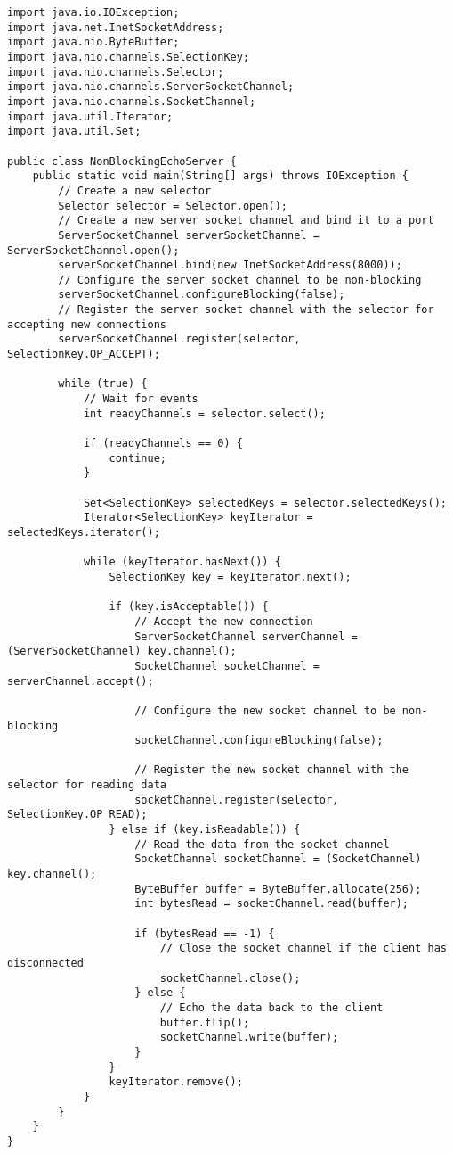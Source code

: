 \documentclass[../vs-script-first-v01.tex]{subfiles}
\begin{document}
\begin{lstlisting}[caption={Non-Blocking},captionpos=b,label={lst:nonb}]
import java.io.IOException;
import java.net.InetSocketAddress;
import java.nio.ByteBuffer;
import java.nio.channels.SelectionKey;
import java.nio.channels.Selector;
import java.nio.channels.ServerSocketChannel;
import java.nio.channels.SocketChannel;
import java.util.Iterator;
import java.util.Set;

public class NonBlockingEchoServer {
    public static void main(String[] args) throws IOException {
        // Create a new selector
        Selector selector = Selector.open();
        // Create a new server socket channel and bind it to a port
        ServerSocketChannel serverSocketChannel = ServerSocketChannel.open();
        serverSocketChannel.bind(new InetSocketAddress(8000));
        // Configure the server socket channel to be non-blocking
        serverSocketChannel.configureBlocking(false);
        // Register the server socket channel with the selector for accepting new connections
        serverSocketChannel.register(selector, SelectionKey.OP_ACCEPT);

        while (true) {
            // Wait for events
            int readyChannels = selector.select();

            if (readyChannels == 0) {
                continue;
            }

            Set<SelectionKey> selectedKeys = selector.selectedKeys();
            Iterator<SelectionKey> keyIterator = selectedKeys.iterator();

            while (keyIterator.hasNext()) {
                SelectionKey key = keyIterator.next();

                if (key.isAcceptable()) {
                    // Accept the new connection
                    ServerSocketChannel serverChannel = (ServerSocketChannel) key.channel();
                    SocketChannel socketChannel = serverChannel.accept();

                    // Configure the new socket channel to be non-blocking
                    socketChannel.configureBlocking(false);

                    // Register the new socket channel with the selector for reading data
                    socketChannel.register(selector, SelectionKey.OP_READ);
                } else if (key.isReadable()) {
                    // Read the data from the socket channel
                    SocketChannel socketChannel = (SocketChannel) key.channel();
                    ByteBuffer buffer = ByteBuffer.allocate(256);
                    int bytesRead = socketChannel.read(buffer);

                    if (bytesRead == -1) {
                        // Close the socket channel if the client has disconnected
                        socketChannel.close();
                    } else {
                        // Echo the data back to the client
                        buffer.flip();
                        socketChannel.write(buffer);
                    }
                }
                keyIterator.remove();
            }
        }
    }
}
\end{lstlisting}
\end{document}
